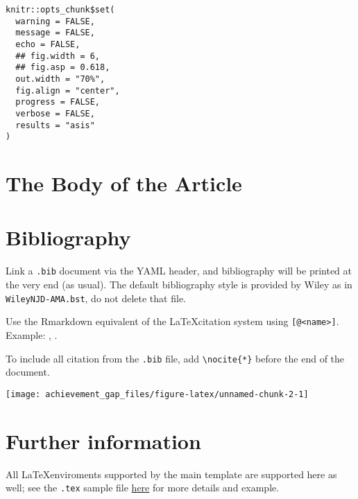 \documentclass[Royal,times,sageh]{sagej}
\begin{document}
\begin{verbatim}
knitr::opts_chunk$set(
  warning = FALSE,
  message = FALSE,
  echo = FALSE,
  ## fig.width = 6,
  ## fig.asp = 0.618,
  out.width = "70%",
  fig.align = "center",
  progress = FALSE,
  verbose = FALSE,
  results = "asis"
)
\end{verbatim}

\hypertarget{the-body-of-the-article}{%
\section{The Body of the Article}\label{the-body-of-the-article}}

\hypertarget{bibliography}{%
\section{Bibliography}\label{bibliography}}

Link a \texttt{.bib} document via the YAML header, and bibliography will
be printed at the very end (as usual). The default bibliography style is
provided by Wiley as in \texttt{WileyNJD-AMA.bst}, do not delete that
file.

Use the Rmarkdown equivalent of the \LaTeX citation system using
\texttt{{[}@\textless{}name\textgreater{}{]}}. Example:
\citep{Taylor1937}, \citep{Knupp1999, Kamm2000}.

To include all citation from the \texttt{.bib} file, add
\texttt{\textbackslash{}nocite\{*\}} before the end of the document.

\begin{center}\texttt{[image: achievement\_gap\_files/figure-latex/unnamed-chunk-2-1]} \end{center}

\hypertarget{further-information}{%
\section{Further information}\label{further-information}}

All \LaTeX enviroments supported by the main template are supported here
as well; see the \texttt{.tex} sample file
\href{http://onlinelibrary.wiley.com/journal/10.1002/(ISSN)1097-0258/homepage/la_tex_class_file.htm}{here}
for more details and example.



\end{document}
